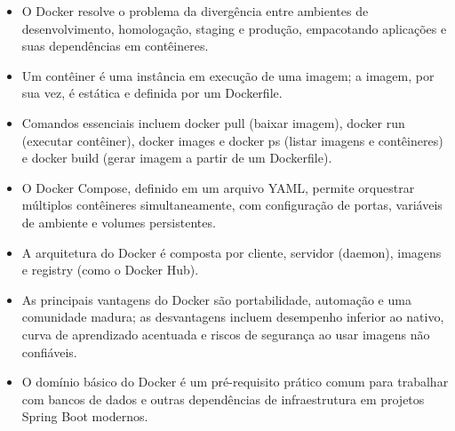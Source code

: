 \begin{itemize}
  \item O Docker resolve o problema da divergência entre ambientes de desenvolvimento, homologação, staging e produção, empacotando aplicações e suas dependências em contêineres.
  \item Um contêiner é uma instância em execução de uma imagem; a imagem, por sua vez, é estática e definida por um Dockerfile.
  \item Comandos essenciais incluem docker pull (baixar imagem), docker run (executar contêiner), docker images e docker ps (listar imagens e contêineres) e docker build (gerar imagem a partir de um Dockerfile).
  \item O Docker Compose, definido em um arquivo YAML, permite orquestrar múltiplos contêineres simultaneamente, com configuração de portas, variáveis de ambiente e volumes persistentes.
  \item A arquitetura do Docker é composta por cliente, servidor (daemon), imagens e registry (como o Docker Hub).
  \item As principais vantagens do Docker são portabilidade, automação e uma comunidade madura; as desvantagens incluem desempenho inferior ao nativo, curva de aprendizado acentuada e riscos de segurança ao usar imagens não confiáveis.
  \item O domínio básico do Docker é um pré-requisito prático comum para trabalhar com bancos de dados e outras dependências de infraestrutura em projetos Spring Boot modernos.
\end{itemize}
